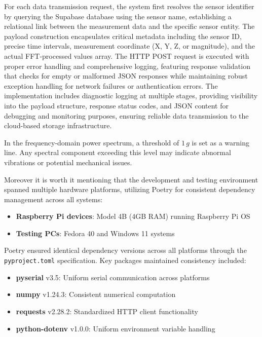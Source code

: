 {	For each data transmission request, the system first resolves the sensor identifier by querying the Supabase database using the sensor name, establishing a relational link between the measurement data and the specific sensor entity. The payload construction encapsulates critical metadata including the sensor ID, precise time intervals, measurement coordinate (X, Y, Z, or magnitude), and the actual FFT-processed values array. The HTTP POST request is executed with proper error handling and comprehensive logging, featuring response validation that checks for empty or malformed JSON responses while maintaining robust exception handling for network failures or authentication errors. The implementation includes diagnostic logging at multiple stages, providing visibility into the payload structure, response status codes, and JSON content for debugging and monitoring purposes, ensuring reliable data transmission to the cloud-based storage infrastructure.
	
	In the frequency-domain power spectrum, a threshold of $1\,g$ is set as a warning line. Any spectral component exceeding this level may indicate abnormal vibrations or potential mechanical issues.
		
	Moreover it is worth it mentioning that the development and testing environment spanned multiple hardware platforms, utilizing Poetry for consistent dependency management across all systems:
	
	\begin{itemize}
		\item \textbf{Raspberry Pi devices}: Model 4B (4GB RAM) running Raspberry Pi OS
		\item \textbf{Testing PCs}: Fedora 40 and Windows 11 systems
	\end{itemize}
	
	Poetry ensured identical dependency versions across all platforms through the \texttt{pyproject.toml} specification. Key packages maintained consistency included:
	
	\begin{itemize}
		\item \textbf{pyserial} v3.5: Uniform serial communication across platforms
		\item \textbf{numpy} v1.24.3: Consistent numerical computation
		\item \textbf{requests} v2.28.2: Standardized HTTP client functionality
		\item \textbf{python-dotenv} v1.0.0: Uniform environment variable handling
	\end{itemize}
	
}
